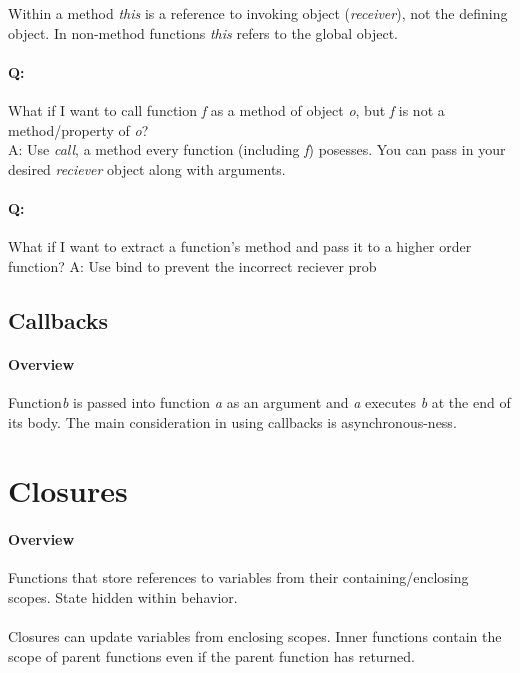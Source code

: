 \documentclass[11pt]{article} %
\begin{document}
Within a method \emph{this} is a reference to invoking object (\emph{receiver}), not the defining object. In non-method
functions \emph{this} refers to the global object.

\paragraph{Q:} What if I want to call function \emph{f} as a method of object \emph{o}, but \emph{f} is not a
method/property of \emph{o}?\\
A: Use \emph{call}, a method every function (including \emph{f}) posesses. You can pass in your desired
\emph{reciever} object along with arguments.

\paragraph{Q:} What if I want to extract a function's method and pass it to a higher order function?
A: Use bind to prevent the incorrect reciever prob

\subsection{Callbacks}

\paragraph{Overview} Function\emph{b} is passed into function \emph{a} as an argument and \emph{a}
executes \emph{b} at the end of its body. The main consideration in using callbacks is asynchronous-ness.


\section{Closures}

\paragraph{Overview} Functions that store references to variables from their
containing/enclosing scopes. State hidden within behavior.

\paragraph{} Closures can update variables from enclosing scopes. Inner functions contain the scope of parent functions even if the parent function has returned.
\end{document}
